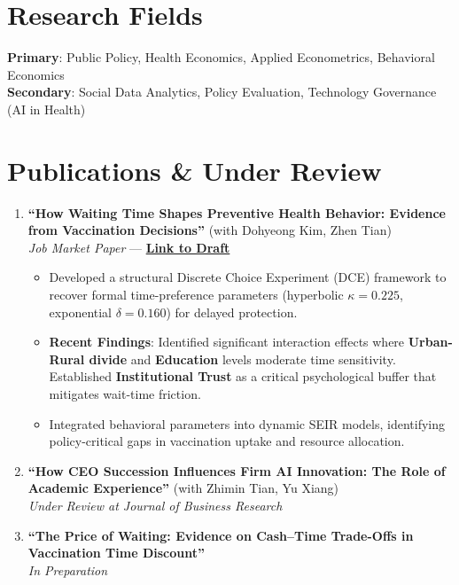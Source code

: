 \documentclass[11pt]{article}
\begin{document}
\section*{Research Fields}
\textbf{Primary}: Public Policy, Health Economics, Applied Econometrics, Behavioral Economics \\
\textbf{Secondary}: Social Data Analytics, Policy Evaluation, Technology Governance (AI in Health)

\section*{Publications \& Under Review}
\begin{enumerate}
    \item \textbf{``How Waiting Time Shapes Preventive Health Behavior: Evidence from Vaccination Decisions''} (with Dohyeong Kim, Zhen Tian) \\
    \textit{Job Market Paper} --- \href{https://yichao2022.github.io/jmp.pdf}{\textbf{Link to Draft}}
    \begin{itemize}[noitemsep, topsep=0pt]
        \item Developed a structural Discrete Choice Experiment (DCE) framework to recover formal time-preference parameters (hyperbolic $\kappa = 0.225$, exponential $\delta = 0.160$) for delayed protection.
        \item \textbf{Recent Findings}: Identified significant interaction effects where \textbf{Urban-Rural divide} and \textbf{Education} levels moderate time sensitivity. Established \textbf{Institutional Trust} as a critical psychological buffer that mitigates wait-time friction.
        \item Integrated behavioral parameters into dynamic SEIR models, identifying policy-critical gaps in vaccination uptake and resource allocation.
    \end{itemize}

    \item \textbf{``How CEO Succession Influences Firm AI Innovation: The Role of Academic Experience''} (with Zhimin Tian, Yu Xiang) \\
    \textit{Under Review at Journal of Business Research}

    \item \textbf{``The Price of Waiting: Evidence on Cash–Time Trade-Offs in Vaccination Time Discount''} \\
    \textit{In Preparation}
\end{enumerate}
\end{document}

